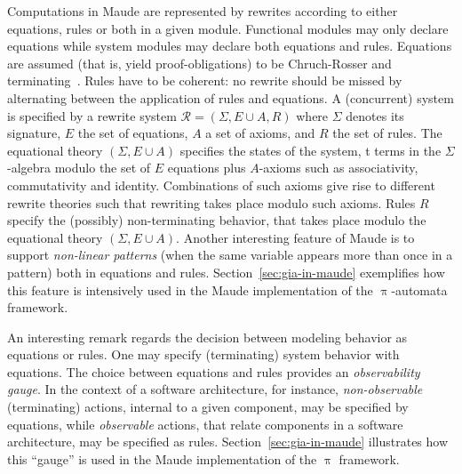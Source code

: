 \documentclass{llncs}%
\begin{document}
Computations in Maude are represented by rewrites according to either equations, rules or both in a given module. Functional modules may only declare equations while system modules may declare both equations and rules. Equations are assumed (that is, yield proof-obligations) to be Chruch-Rosser and terminating~\cite{Baader:1998:TR:280474}. Rules have to be coherent: no rewrite should be missed by alternating between the application of rules and equations. 
A (concurrent) system is specified by a rewrite system $\mathcal{R} = (\Sigma, E \cup A, R)$ where $\Sigma$ denotes its signature, $E$ the set of equations, $A$ a set of axioms, and $R$ the set of rules. The equational theory $(\Sigma, E \cup A)$ specifies the states of the system, t terms in the $\Sigma$-algebra modulo the set of $E$ equations plus $A$-axioms such as associativity, commutativity and identity. Combinations of such axioms give rise to different rewrite theories such that rewriting takes place modulo such axioms. Rules $R$ specify the (possibly) non-terminating behavior, that takes place modulo the equational theory $(\Sigma, E \cup A)$. 
Another interesting feature of Maude is to support \emph{non-linear patterns} (when the same variable appears more than once in a pattern) both in equations and rules. Section~\ref{sec:gia-in-maude} exemplifies how this feature is intensively used in the Maude implementation of the $\uppi$-automata framework.

An interesting remark regards the decision between modeling behavior as equations or rules.  One may specify (terminating) system behavior with equations. The choice between equations and rules provides an \emph{observability gauge}. In the context of a software architecture, for instance, \emph{non-observable} (terminating) actions, internal to a given component, may be specified by equations, while \emph{observable} actions, that relate components in a software architecture, may be specified as rules.  Section~\ref{sec:gia-in-maude} illustrates how this ``gauge'' is used in the Maude implementation of the $\uppi$ framework.  
\end{document}
